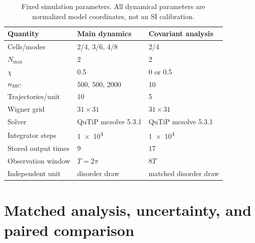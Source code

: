 \documentclass[aps,pra,preprint,superscriptaddress,amsmath,amssymb]{revtex4-2}
\begin{document}
\begin{table}[h]
\caption{Fixed simulation parameters. All dynamical parameters are normalized model coordinates, not an SI calibration.}
\label{tab:parameters}
\begin{ruledtabular}
\begin{tabular}{lll}
Quantity & Main dynamics & Covariant analysis \\
\hline
Cells/modes & \num{2}/\num{4}, \num{3}/\num{6}, \num{4}/\num{8} & \num{2}/\num{4} \\
$N_{\max}$ & \num{2} & \num{2} \\
$\chi$ & \num{0.5} & \num{0} or \num{0.5} \\
$n_{\rm MC}$ & \num{500}, \num{500}, \num{2000} & \num{10} \\
Trajectories/unit & \num{10} & \num{5} \\
Wigner grid & $\num{31}\times\num{31}$ & $\num{31}\times\num{31}$ \\
Solver & QuTiP mcsolve 5.3.1 & QuTiP mcsolve 5.3.1 \\
Integrator steps & \num[retain-unity-mantissa = false]{1e4} & \num[retain-unity-mantissa = false]{1e4} \\
Stored output times & \num{9} & \num{17} \\
Observation window & $T=2\pi$ & $\num{8}T$ \\
Independent unit & disorder draw & matched disorder draw \\
\end{tabular}
\end{ruledtabular}
\end{table}

\section{Matched analysis, uncertainty, and paired comparison}
\label{sec:statistics}
\end{document}
